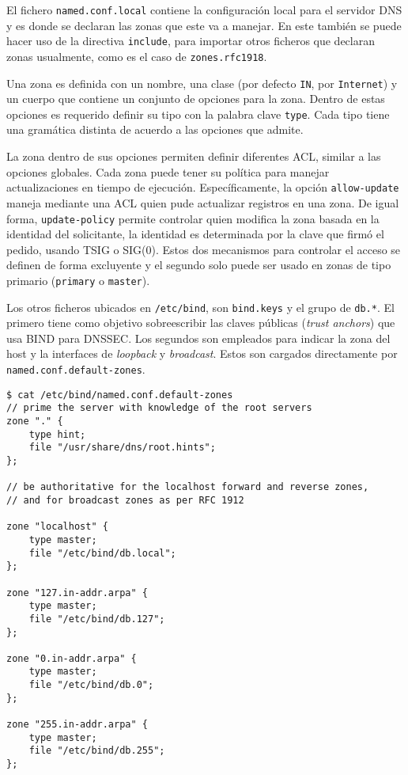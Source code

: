 El fichero \verb+named.conf.local+ contiene la configuración local para el servidor DNS y es donde se declaran las zonas que este va a manejar. En este también se puede hacer uso de la directiva \verb+include+, para importar otros ficheros que declaran zonas usualmente, como es el caso de \verb+zones.rfc1918+.

Una zona es definida con un nombre, una clase (por defecto \verb+IN+, por \verb+Internet+) y un cuerpo que contiene un conjunto de opciones para la zona. Dentro de estas opciones es requerido definir su tipo con la palabra clave \verb+type+. Cada tipo tiene una gramática distinta de acuerdo a las opciones que admite.

La zona dentro de sus opciones permiten definir diferentes ACL, similar a las opciones globales. Cada zona puede tener su política para manejar actualizaciones en tiempo de ejecución. Específicamente, la opción \verb+allow-update+ maneja mediante una ACL quien pude actualizar registros en una zona. De igual forma, \verb+update-policy+ permite controlar quien modifica la zona basada en la identidad del solicitante, la identidad es determinada por la clave que firmó el pedido, usando TSIG o SIG(0). Estos dos mecanismos para controlar el acceso se definen de forma excluyente y el segundo solo puede ser usado en zonas de tipo primario (\verb+primary+ o \verb+master+).

Los otros ficheros ubicados en \verb+/etc/bind+, son \verb+bind.keys+ y el grupo de \verb+db.*+. El primero tiene como objetivo sobreescribir las claves públicas (\textit{trust anchors}) que usa BIND para DNSSEC. Los segundos son empleados para indicar la zona del host y la interfaces de \textit{loopback} y \textit{broadcast}. Estos son cargados directamente por \verb+named.conf.default-zones+.

\begin{lstlisting}[frame=single, numbers=none, caption=Contenido del fichero \textbf{named.conf.default-zones}]
$ cat /etc/bind/named.conf.default-zones
// prime the server with knowledge of the root servers
zone "." {
    type hint;
    file "/usr/share/dns/root.hints";
};

// be authoritative for the localhost forward and reverse zones,
// and for broadcast zones as per RFC 1912

zone "localhost" {
    type master;
    file "/etc/bind/db.local";
};

zone "127.in-addr.arpa" {
    type master;
    file "/etc/bind/db.127";
};

zone "0.in-addr.arpa" {
    type master;
    file "/etc/bind/db.0";
};

zone "255.in-addr.arpa" {
    type master;
    file "/etc/bind/db.255";
};
\end{lstlisting}

